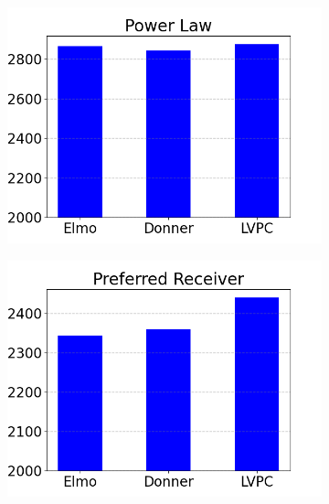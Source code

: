   \addtolength{\intextsep}{-15pt}
  \begin{figure}
  \begin{subfigure}{.3293\textwidth}
  \includegraphics[width=\textwidth]{../simulation/Delays_power_law.png}
  \end{subfigure}
  \begin{subfigure}{.3293\textwidth}
  \includegraphics[width=\textwidth]{../simulation/Delays_preferred_receiver.png}
  \end{subfigure}
  \begin{subfigure}{.3293\textwidth}

\end{subfigure}
\end{figure}
